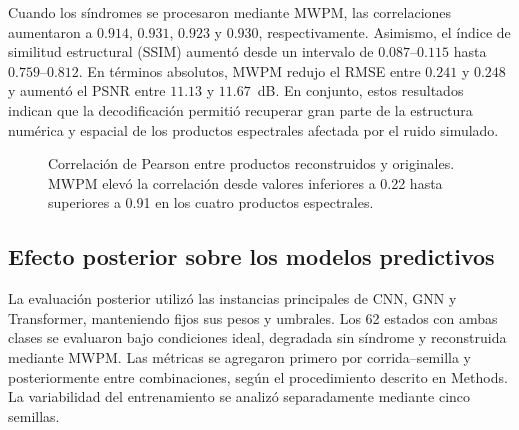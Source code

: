 \documentclass[fleqn,10pt]{wlscirep}
\begin{document}
Cuando los síndromes se procesaron mediante MWPM, las correlaciones
aumentaron a $0.914$, $0.931$, $0.923$ y $0.930$, respectivamente.
Asimismo, el índice de similitud estructural (SSIM) aumentó desde un
intervalo de $0.087$--$0.115$ hasta $0.759$--$0.812$. En términos
absolutos, MWPM redujo el RMSE entre $0.241$ y $0.248$ y aumentó el
PSNR entre $11.13$ y $11.67$~dB. En conjunto, estos resultados indican
que la decodificación permitió recuperar gran parte de la estructura
numérica y espacial de los productos espectrales afectada por el ruido
simulado.


\begin{figure}[H]
\centering
{}
\caption{Correlación de Pearson entre productos reconstruidos y originales. MWPM elevó la correlación desde valores inferiores a 0.22 hasta superiores a 0.91 en los cuatro productos espectrales.}
\label{fig:correlacion_espectral}
\end{figure}


\subsection*{Efecto posterior sobre los modelos predictivos}

La evaluación posterior utilizó las instancias principales de CNN, GNN y Transformer, manteniendo fijos sus pesos y umbrales. Los 62 estados con ambas clases se evaluaron bajo condiciones ideal, degradada sin síndrome y reconstruida mediante MWPM. Las métricas se agregaron primero por corrida--semilla y posteriormente entre combinaciones, según el procedimiento descrito en Methods. La variabilidad del entrenamiento se analizó separadamente mediante cinco semillas.
\end{document}
